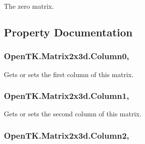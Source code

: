 The zero matrix. 



\subsection{Property Documentation}
\hypertarget{struct_open_t_k_1_1_matrix2x3d_ac6408e2c056007e95dce77a0609d7771}{
\subsubsection[{Column0}]{ Open\-T\-K.\-Matrix2x3d.\-Column0\hspace{0.3cm}{\ttfamily [get]}, {\ttfamily [set]}}}\label{struct_open_t_k_1_1_matrix2x3d_ac6408e2c056007e95dce77a0609d7771}


Gets or sets the first column of this matrix. 

\hypertarget{struct_open_t_k_1_1_matrix2x3d_a52cb711e51ce9a5e30df86b0e4d27a1d}{
\subsubsection[{Column1}]{ Open\-T\-K.\-Matrix2x3d.\-Column1\hspace{0.3cm}{\ttfamily [get]}, {\ttfamily [set]}}}\label{struct_open_t_k_1_1_matrix2x3d_a52cb711e51ce9a5e30df86b0e4d27a1d}


Gets or sets the second column of this matrix. 

\hypertarget{struct_open_t_k_1_1_matrix2x3d_a30a95e42f9b0a9a0976c2b0fd1f4f9f0}{
\subsubsection[{Column2}]{ Open\-T\-K.\-Matrix2x3d.\-Column2\hspace{0.3cm}{\ttfamily [get]}, {\ttfamily [set]}}}\label{struct_open_t_k_1_1_matrix2x3d_a30a95e42f9b0a9a0976c2b0fd1f4f9f0}


